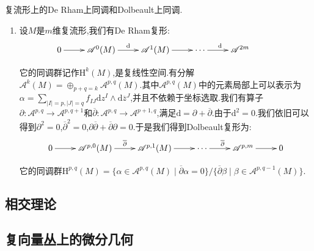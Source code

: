 复流形上的De Rham上同调和Dolbeault上同调.
\begin{enumerate}
	\item 设$M$是$m$维复流形,我们有De Rham复形:
	$$\xymatrix{0\ar[r]&\mathscr{A}^0(M)\ar[r]^{\mathrm{d}}&\mathscr{A}^1(M)\ar[r]&\cdots\ar[r]^{\mathrm{d}}&\mathscr{A}^{2m}&}$$
	
	它的同调群记作$\mathrm{H}^k(M)$,是复线性空间.有分解$\mathscr{A}^k(M)=\oplus_{p+q=k}\mathscr{A}^{p,q}(M)$.其中$\mathscr{A}^{p,q}(M)$中的元素局部上可以表示为$\alpha=\sum_{|I|=p,|J|=q}f_{IJ}\mathrm{d}z^I\wedge\mathrm{d}\overline{z}^J$,并且不依赖于坐标选取.我们有算子$\partial:\mathscr{A}^{p,q}\to\mathscr{A}^{p,q+1}$和$\overline{\partial}:\mathscr{A}^{p,q}\to\mathscr{A}^{p+1,q}$,满足$\mathrm{d}=\partial+\overline{\partial}$.由于$\mathrm{d}^2=0$.我们依旧可以得到$\partial^2=0$,$\overline{\partial}^2=0$,$\partial\overline{\partial}+\overline{\partial}\partial=0$.于是我们得到Dolbeault复形为:
	$$\xymatrix{0\ar[r]&\mathscr{A}^{p,0}(M)\ar[r]^{\overline{\partial}}&\mathscr{A}^{p,1}(M)\ar[r]&\cdots\ar[r]^{\overline{\partial}}&\mathscr{A}^{p,m}\ar[r]&0}$$
	
	它的同调群$\mathrm{H}^{p,q}(M)=\{\alpha\in\mathscr{A}^{p,q}(M)\mid\overline{\partial}\alpha=0\}/\{\overline{\partial}\beta\mid\beta\in\mathscr{A}^{p,q-1}(M)\}$.
\end{enumerate}





\newpage
\subsection{相交理论}




\newpage
\subsection{复向量丛上的微分几何}

